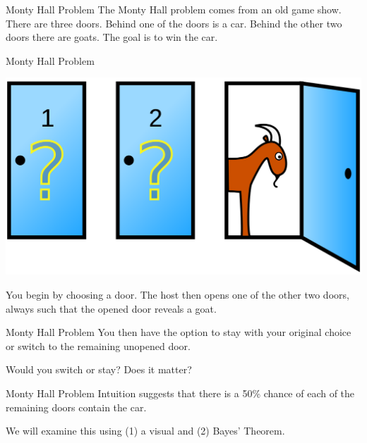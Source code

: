 \begin{frame}{Monty Hall Problem}
    The Monty Hall problem comes from an old game show. There are three doors. Behind one of the doors is a car. Behind the other two doors there are goats. The goal is to win the car.
\end{frame}

\begin{frame}{Monty Hall Problem}
    \begin{center}
        \includegraphics[scale=0.2]{images/montyhall.png}
    \end{center}
    You begin by choosing a door. The host then opens one of the other two doors, always such that the opened door reveals a goat.
\end{frame}

\begin{frame}{Monty Hall Problem}
    You then have the option to stay with your original choice or switch to the remaining unopened door.
    
    \vspace{12pt}Would you switch or stay? Does it matter?
\end{frame}

\begin{frame}{Monty Hall Problem}
    Intuition suggests that there is a 50\% chance of each of the remaining doors contain the car.
    
    \vspace{12pt}We will examine this using (1) a visual and (2) Bayes' Theorem.
\end{frame}

